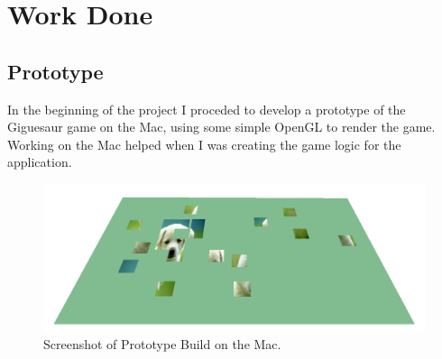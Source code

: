 \documentclass{article}
\begin{document}

\section{Work Done}

\subsection{Prototype}
In the beginning of the project I proceded to develop a prototype of the Giguesaur game on the Mac, using some simple OpenGL to render the game. Working on the Mac helped when I was creating the game logic for the application.

\begin{figure}[ht]
\begin{center}
\includegraphics[width=1\textwidth]{images/MacBuildImage}
\caption{Screenshot of Prototype Build on the Mac.}
\label{fig:MacBuild}
\end{center}
\end{figure}

\end{document}
